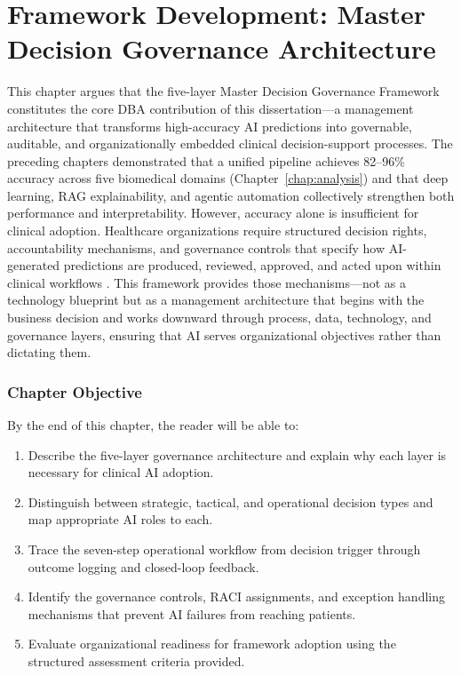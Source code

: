 
\chapter{Framework Development: Master Decision Governance Architecture}
\label{chap:framework}

This chapter argues that the five-layer Master Decision Governance Framework constitutes the core DBA contribution of this dissertation---a management architecture that transforms high-accuracy AI predictions into governable, auditable, and organizationally embedded clinical decision-support processes. The preceding chapters demonstrated that a unified pipeline achieves 82--96\% accuracy across five biomedical domains (Chapter~\ref{chap:analysis}) and that deep learning, RAG explainability, and agentic automation collectively strengthen both performance and interpretability. However, accuracy alone is insufficient for clinical adoption. Healthcare organizations require structured decision rights, accountability mechanisms, and governance controls that specify how AI-generated predictions are produced, reviewed, approved, and acted upon within clinical workflows \citep{topol2019deep, kelly2019healthcare}. This framework provides those mechanisms---not as a technology blueprint but as a management architecture that begins with the business decision and works downward through process, data, technology, and governance layers, ensuring that AI serves organizational objectives rather than dictating them.

\subsection{Chapter Objective}
\label{sec:fw_objective}

By the end of this chapter, the reader will be able to:
\begin{enumerate}[label=\alph*)]
    \item Describe the five-layer governance architecture and explain why each layer is necessary for clinical AI adoption.
    \item Distinguish between strategic, tactical, and operational decision types and map appropriate AI roles to each.
    \item Trace the seven-step operational workflow from decision trigger through outcome logging and closed-loop feedback.
    \item Identify the governance controls, RACI assignments, and exception handling mechanisms that prevent AI failures from reaching patients.
    \item Evaluate organizational readiness for framework adoption using the structured assessment criteria provided.
\end{enumerate}

